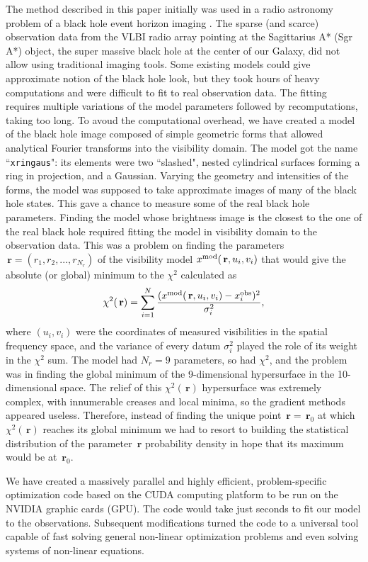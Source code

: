 \documentclass[preprint2]{aastex}
\newcommand{\bfr}{\,\mathbf{r}}
\begin{document}
The method described in this paper initially was used in a radio astronomy problem of a black hole event horizon imaging \citep{BenkevBHM}. The sparse (and scarce) observation data from the VLBI radio array pointing at the Sagittarius A* (Sgr A*) object, the super massive black hole at the center of our Galaxy, did not allow using traditional imaging tools. Some existing models could give approximate notion of the black hole look, but they took hours of heavy computations and were difficult to fit to real observation data. The fitting requires multiple variations of the model parameters followed by recomputations, taking too long. To avoud the computational overhead, we have created a model of the black hole image composed of simple geometric forms that allowed analytical Fourier transforms into the visibility domain. The model got the name ``\verb|xringaus|": its elements were two ``slashed", nested cylindrical surfaces forming a ring in projection, and a Gaussian. Varying the geometry and intensities of the forms, the model was supposed to take approximate images of many of the black hole states. This gave a chance to measure some of the real black hole parameters. Finding the model whose brightness image is the closest to the one of the real black hole required fitting the model in visibility domain to the observation data. This was a problem on finding the parameters $\bfr=(r_1,r_2,...,r_{N_r})$ of the visibility model $x^{\rm mod}(\bfr,u_i,v_i)$ that would give the absolute (or global) minimum to the $\chi^2$ calculated as
\begin{equation}
  \label{chi2}
  \chi^2(\bfr) = \sum_{i=1}^{N} \frac{(x^{\rm mod}(\bfr,u_i,v_i) - x_i^{\rm obs})^2}{\sigma_i^2},
\end{equation}
where $(u_i,v_i)$ were the coordinates of measured visibilities in the spatial frequency space, and the variance of every datum $\sigma_i^2$ played the role of its weight in the $\chi^2$ sum. The model had $N_r = 9$ parameters, so had $\chi^2$, and the problem was in finding the global minimum of the 9-dimensional hypersurface in the 10-dimensional space. The relief of this $\chi^2(\bfr)$ hypersurface was extremely complex, with innumerable creases and local minima, so the gradient methods appeared useless. Therefore, instead of finding the unique point $\bfr = \bfr_0$ at which $\chi^2(\bfr)$ reaches its global minimum we had to resort to building the statistical distribution of the parameter $\bfr$ probability density in hope that its maximum would be at $\bfr_0$. 

We have created a massively parallel and highly efficient, problem-specific optimization code based on the CUDA computing platform to be run on the NVIDIA graphic cards (GPU). The code would take just seconds to fit our model to the observations. Subsequent modifications turned the code to a universal tool capable of fast solving general non-linear optimization problems and even solving systems of non-linear equations. 
\end{document}
